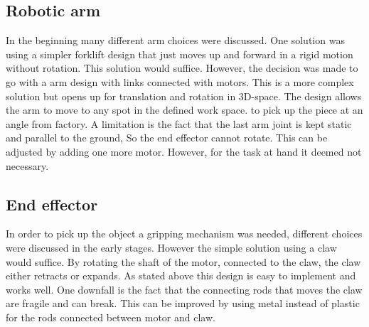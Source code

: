 
\subsection{Robotic arm}
In the beginning many different arm choices were discussed. One solution was using a simpler forklift design that just moves up and forward in a rigid motion without rotation.
This solution would suffice. However, the decision was made to go with a arm design with links connected with motors.
This is a more complex solution but opens up for translation and rotation in 3D-space.
The design allows the arm to move to any spot in the defined work space.
to pick up the piece at an angle from factory.
A limitation is the fact that the last arm joint is kept static and parallel to the ground, So the end effector cannot rotate. 
This can be adjusted by adding one more motor. However, for the task at hand it deemed not necessary.

\subsection{End effector}
In order to pick up the object a gripping mechanism was needed, different choices were discussed in the early stages.
However the simple solution using a claw would suffice.
By rotating the shaft of the motor, connected to the claw, the claw either retracts or expands.
As stated above this design is easy to implement and works well.
One downfall is the fact that the connecting rods that moves the claw are fragile and can break.
This can be improved by using metal instead of plastic for the rods connected between motor and claw. 


